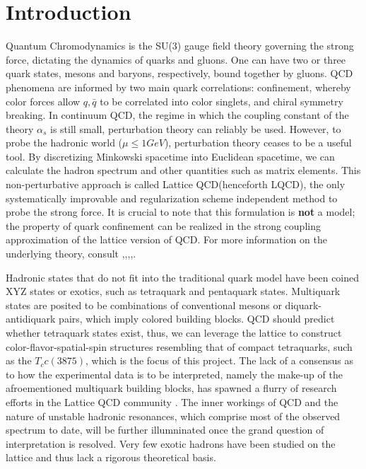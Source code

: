 
\chapter{Introduction}
\label{sec:intro}
\newcommand{\todo}[1]{\textbf{\color{red}TODO: #1}}

Quantum Chromodynamics is the SU(3) gauge field theory governing the strong force, dictating the dynamics of quarks and gluons. One can have two or three quark states, mesons and baryons, respectively, bound together by gluons. QCD phenomena are informed by two main quark correlations: confinement, whereby color forces allow $q,\bar{q}$ to be correlated into color singlets, and chiral symmetry breaking. In continuum QCD, the regime in which the coupling constant of the theory $\alpha_s$ is still small, perturbation theory can reliably be used. However, to probe the hadronic world ($\mu \leq 1 GeV$), perturbation theory ceases to be a useful tool. By discretizing Minkowski spacetime into Euclidean spacetime, we can calculate the hadron spectrum and other quantities such as matrix elements.  This non-perturbative approach is called Lattice QCD(henceforth LQCD), the only systematically improvable and regularization scheme independent method to probe the strong force. It is crucial to note that this formulation is \textbf{not} a model; the property of quark confinement can be realized in the strong coupling approximation of the lattice version of QCD. For more information on the underlying theory, consult \cite{10.5555/3029317},\cite{gupta1998introductionlatticeqcd},\cite{Gattringer2009QuantumCO},\cite{Griffiths:1987tj},\cite{Cheng1984GaugeTO}.


Hadronic states that do not fit into the traditional quark model have been coined XYZ states \cite{Brambilla:2019esw} or exotics, such as tetraquark and pentaquark states\cite{Cheung_2017}. Multiquark states are posited to be combinations of conventional mesons or diquark-antidiquark pairs, which imply colored building blocks. QCD should predict whether tetraquark states exist, thus, we can leverage the lattice to construct color-flavor-spatial-spin structures resembling that of compact tetraquarks, such as the $T_cc(3875)$, which is the focus of this project.  The lack of a consensus as to how the experimental data is to be interpreted, namely the make-up of the afroementioned multiquark building blocks, has spawned a flurry of research efforts in the Lattice QCD community \cite{Cheung_2017}. The inner workings of QCD and the nature of unstable hadronic resonances, which comprise most of the observed spectrum to date,  will be further illumninated once the grand question of interpretation is resolved. Very few exotic hadrons have been studied on the lattice and thus lack a rigorous theoretical basis.


